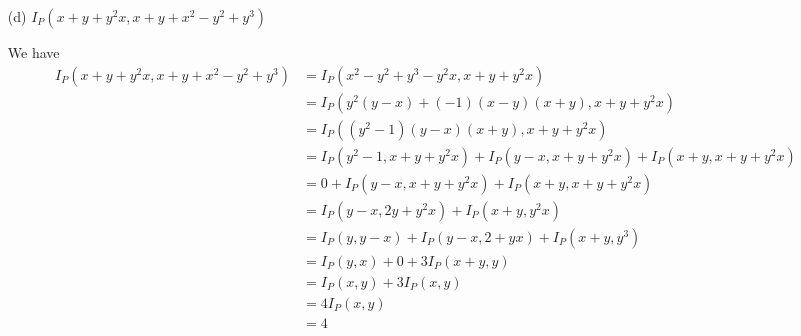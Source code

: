 \documentclass{article}
\begin{document}
\begin{itemize}
        \item [(d)] $I_{P}(x + y + y^{2}x, x + y + x^{2} - y^{2} + y^{3})$ 
            \begin{answer}
                We have
                    \begin{align*}
                        I_{P}(x + y + y^{2}x, x + y + x^{2} -y^{2} + y^{3}) &= I_{P}(x^{2} - y^{2} + y^{3} - y^{2}x, x + y + y^{2}x)                                          \\
                                                                            &= I_{P}(y^{2}(y - x) + (-1)(x - y)(x + y), x + y + y^{2}x)                                       \\
                                                                            &= I_{P}((y^{2} - 1)(y - x)(x + y), x + y + y^{2}x)                                               \\
                                                                            &= I_{P}(y^{2} - 1, x + y + y^{2}x) + I_{P}(y - x, x + y + y^{2}x) + I_{P}(x + y, x + y + y^{2}x) \\
                                                                            &= 0 + I_{P}(y - x, x + y + y^{2}x) + I_{P}(x + y, x + y + y^{2}x)                                \\
                                                                            &= I_{P}(y - x, 2y + y^{2}x) + I_{P}(x + y, y^{2}x)                                               \\
                                                                            &= I_{P}(y, y - x) + I_{P}(y - x, 2 + yx) + I_{P}(x + y, y^{3})                                   \\
                                                                            &= I_{P}(y, x) + 0 + 3I_{P}(x + y, y)                                                             \\
                                                                            &= I_{P}(x, y) + 3I_{P}(x, y)                                                                     \\
                                                                            &= 4I_{P}(x, y)                                                                                   \\
                                                                            &= 4                                                                                                
                    \end{align*}
            \end{answer}
    \end{itemize}
\end{document}
